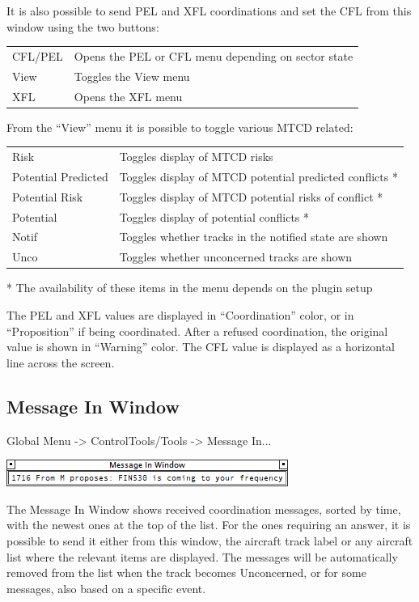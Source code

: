 \documentclass[11pt,a4paper,oldfontcommands]{memoir}
\begin{document}
It is also possible to send PEL and XFL coordinations and set the CFL from this window using the two buttons:

\begin{tabular}{l l}
    CFL/PEL     & Opens the PEL or CFL menu depending on sector state\\
    View        & Toggles the View menu\\
    XFL         & Opens the XFL menu\\
\end{tabular}

From the “View” menu it is possible to toggle various MTCD related:

\begin{tabular}{l l}
    Risk                    & Toggles display of MTCD risks\\
    Potential Predicted     & Toggles display of MTCD potential predicted conflicts *\\
    Potential Risk          & Toggles display of MTCD potential risks of conflict *\\
    Potential               & Toggles display of potential conflicts *\\
    Notif                   & Toggles whether tracks in the notified state are shown\\
    Unco                    & Toggles whether unconcerned tracks are shown\\
\end{tabular}

* The availability of these items in the menu depends on the plugin setup

The PEL and XFL values are displayed in “Coordination” color, or in “Proposition” if being coordinated. After a refused coordination, the original value is shown in “Warning” color. The CFL value is displayed as a horizontal line across the screen.

\subsection{Message In Window}
\label{win:miw}

Global Menu -> ControlTools/Tools -> Message In...

\includegraphics{img/miw.png}

The Message In Window shows received coordination messages, sorted by time, with the newest ones at the top of the list. For the ones requiring an answer, it is possible to send it either from this window, the aircraft track label or any aircraft list where the relevant items are displayed. The messages will be automatically removed from the list when the track becomes Unconcerned, or for some messages, also based on a specific event.
\end{document}
